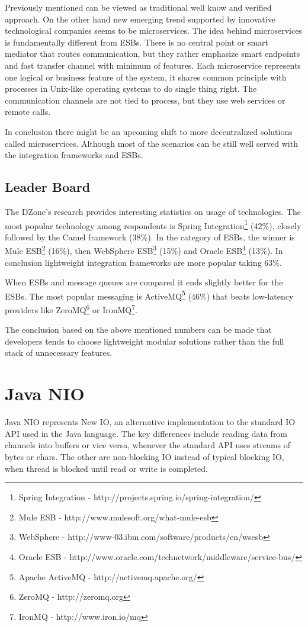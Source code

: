 \documentclass[12pt,final,oneside]{fithesis2}
\begin{document}
 Previously mentioned can be viewed as traditional well know and verified approach. On the other hand new emerging trend supported by innovative technological companies seems to be microservices. The idea behind microservices is fundamentally different from ESBs. There is no central point or smart mediator that routes communication, but they rather emphasize smart endpoints and fast transfer channel with minimum of features. Each microservice represents one logical or business feature of the system, it shares common principle with processes in Unix-like operating systems to do single thing right. The communication channels are not tied to process, but they use web services or remote calls.

In conclusion there might be an upcoming shift to more decentralized solutions called microservices. Although most of the scenarios can be still well served with the integration frameworks and ESBs.

\subsection*{Leader Board}
The DZone's research provides interesting statistics on usage of technologies. 
The most popular technology among respondents is Spring Integration\footnote{Spring Integration - http://projects.spring.io/spring-integration/} (42\%), closely followed by the Camel framework (38\%). In the category of ESBs, the winner is Mule ESB\footnote{Mule ESB - http://www.mulesoft.org/what-mule-esb} (16\%), then WebSphere ESB\footnote{WebSphere - http://www-03.ibm.com/software/products/en/wsesb} (15\%) and Oracle ESB\footnote{Oracle ESB -  http://www.oracle.com/technetwork/middleware/service-bus/} (13\%). In conclusion lightweight integration frameworks are more popular taking 63\%.

 When ESBs and message queues are compared it ends slightly better for the ESBs. The most popular messaging is ActiveMQ\footnote{Apache ActiveMQ - http://activemq.apache.org/} (46\%) that beats low-latency providers like ZeroMQ\footnote{ZeroMQ - http://zeromq.org} or IronMQ\footnote{IronMQ - http://www.iron.io/mq}. 
 
 The conclusion based on the above mentioned numbers can be made that developers tends to choose lightweight modular solutions rather than the full stack of unnecessary features.




  
 \section{Java NIO}
Java NIO represents New IO, an alternative implementation to the standard IO API used in the Java language. The key differences include reading data from channels into buffers or vice versa, whenever the standard API uses streams of bytes or chars. The other are non-blocking IO instead of typical blocking IO, when thread is blocked until read or write is completed.
\end{document}

